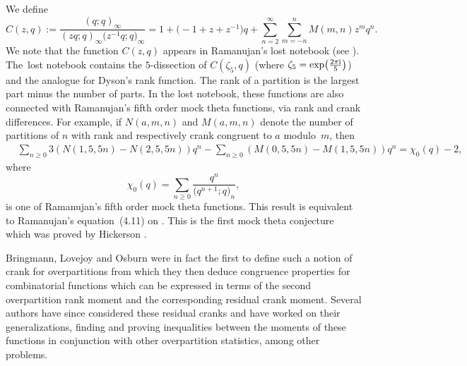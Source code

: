 \documentclass[pdftex]{sigma}
\numberwithin{equation}{section}
\begin{document}
We define
\begin{equation*}%
C(z,q) :=\dfrac{(q;q)_{\infty}}{(zq;q)_{\infty}\bigl(z^{-1}q;q\bigr)_{\infty}}
=1+\bigl(-1+z+z^{-1}\bigr)q+\sum_{n=2}^\infty \sum_{m=-n}^n M(m,n)z^mq^n.
\end{equation*}%
We note that the function $C(z,q)$ appears in Ramanujan's lost notebook (see \cite{Ga86,Ga88b,Ga88}). The~lost notebook contains the $5$-dissection of $C(\zeta_5,q)$ \big(where $\zeta_5=\exp\bigl(\frac{2\pi {\rm i}}{5}\bigr)$\big) and the analogue for Dyson's rank function. The rank of a partition is the largest part minus the number of parts. In the lost notebook, these functions are also connected with Ramanujan's fifth order mock theta functions, via rank and crank differences. For example, if $N(a,m,n)$ and $M(a,m,n)$ denote the number of partitions of $n$ with rank and respectively crank congruent to $a$ modulo~$m$, then
\begin{align*}
&{}\sum_{n\geq 0}3(N(1,5,5n)-N(2,5,5n))q^n-\sum_{n\geq 0}(M(0,5,5n)-M(1,5,5n))q^n
=\chi_0(q)-2,
\end{align*}
where
\begin{equation*}%
\chi_0(q)=\sum\limits_{n\geq 0}\frac{q^n}{\bigl(q^{n+1};q\bigr)_{n}},
\end{equation*}%
is one of Ramanujan's fifth order mock theta functions. This result is equivalent to Ramanujan's equation~(4.11) on \cite[p.~36]{Ga88b}. This is the first mock theta conjecture \cite{An-Ga89} which was proved by Hickerson \cite{Hi}.

Bringmann, Lovejoy and Osburn \cite{Br-Lo-Os} were in fact the first to define such a notion of crank for overpartitions from which they then deduce congruence properties for combinatorial functions which can be expressed in terms of the second overpartition rank moment and the corresponding residual crank moment. Several authors have since considered these residual cranks and have worked on their generalizations, finding and proving inequalities between the moments of these functions in conjunction with other overpartition statistics, among other problems.
\end{document}
